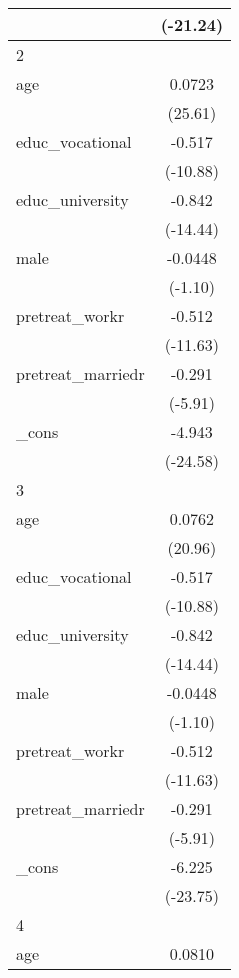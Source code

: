 {\begin{tabular}{l*{1}{c}}
            &    (-21.24)         \\
\hline
2           &                     \\
age         &      0.0723\sym{***}\\
            &     (25.61)         \\
[1em]
educ\_vocational&      -0.517\sym{***}\\
            &    (-10.88)         \\
[1em]
educ\_university&      -0.842\sym{***}\\
            &    (-14.44)         \\
[1em]
male        &     -0.0448         \\
            &     (-1.10)         \\
[1em]
pretreat\_workr&      -0.512\sym{***}\\
            &    (-11.63)         \\
[1em]
pretreat\_marriedr&      -0.291\sym{***}\\
            &     (-5.91)         \\
[1em]
\_cons      &      -4.943\sym{***}\\
            &    (-24.58)         \\
\hline
3           &                     \\
age         &      0.0762\sym{***}\\
            &     (20.96)         \\
[1em]
educ\_vocational&      -0.517\sym{***}\\
            &    (-10.88)         \\
[1em]
educ\_university&      -0.842\sym{***}\\
            &    (-14.44)         \\
[1em]
male        &     -0.0448         \\
            &     (-1.10)         \\
[1em]
pretreat\_workr&      -0.512\sym{***}\\
            &    (-11.63)         \\
[1em]
pretreat\_marriedr&      -0.291\sym{***}\\
            &     (-5.91)         \\
[1em]
\_cons      &      -6.225\sym{***}\\
            &    (-23.75)         \\
\hline
4           &                     \\
age         &      0.0810\sym{***}\\

\end{tabular}}
